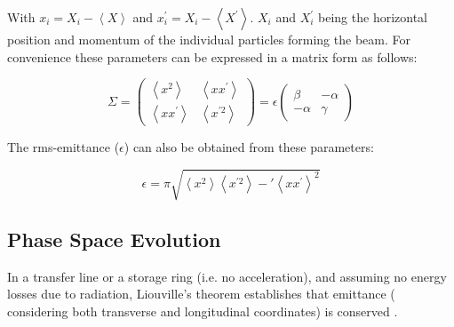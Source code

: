 With $x_{i} = X_{i} - \left< X \right>$ and $x^{'}_{i} = X_{i} - \left< X^{'}\right>$. $X_{i}$ and $X_{i}^{'}$ being the horizontal position and momentum of the individual particles forming the beam. For convenience these parameters can be expressed in a matrix form as follows: 

\begin{equation}
    \Sigma = 
    \begin{pmatrix}
        \left< x^{2} \right> & \left< x x^{'} \right> \\
        \left< x x^{'} \right> & \left< x^{' 2} \right>
    \end{pmatrix}
    = \epsilon 
    \begin{pmatrix}
        \beta & - \alpha \\ -\alpha  & \gamma
    \end{pmatrix}
\end{equation}

The rms-emittance ($\epsilon$) can also be obtained from these parameters: 

\begin{equation}
    \epsilon = \pi \sqrt{\left<x^{2}\right>\left< x^{'2}\right> - '\left<x x^{'}\right>^{2}}
\end{equation}



\subsection{Phase Space Evolution}
\label{subsec:PhaseSpaceEvol}

In a transfer line or a storage ring (i.e. no acceleration), and assuming no energy losses due to radiation, Liouville's theorem establishes that emittance ( considering both transverse and longitudinal coordinates) is conserved \parencite*[][]{ref:EmittanceConserv}.

